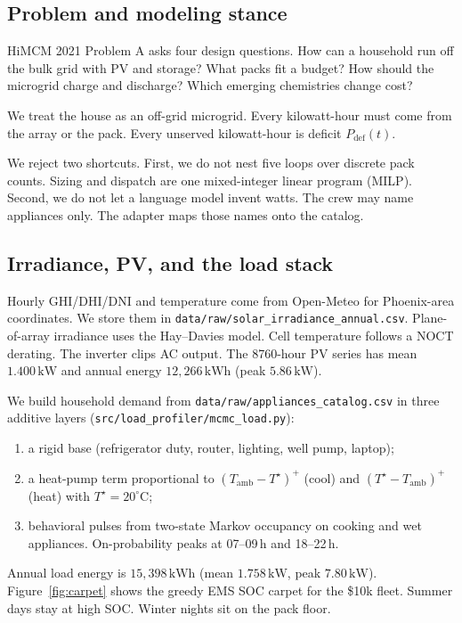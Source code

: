 \documentclass[12pt]{article}
\begin{document}
\subsection{Problem and modeling stance}
HiMCM 2021 Problem A asks four design questions. How can a household
run off the bulk grid with PV and storage? What packs fit a budget?
How should the microgrid charge and discharge? Which emerging
chemistries change cost?

We treat the house as an off-grid microgrid. Every kilowatt-hour must
come from the array or the pack. Every unserved kilowatt-hour is deficit
\(P_{\mathrm{def}}(t)\).

We reject two shortcuts. First, we do not nest five loops over discrete
pack counts. Sizing and dispatch are one mixed-integer linear program
(MILP). Second, we do not let a language model invent watts. The crew
may name appliances only. The adapter maps those names onto the catalog.

\subsection{Irradiance, PV, and the load stack}
Hourly GHI/DHI/DNI and temperature come from Open-Meteo for Phoenix-area
coordinates. We store them in
\texttt{data/raw/solar\_irradiance\_annual.csv}. Plane-of-array irradiance
uses the Hay--Davies model. Cell temperature follows a NOCT derating.
The inverter clips AC output. The 8760-hour PV series has mean
\(1.400\,\mathrm{kW}\) and annual energy \(12{,}266\,\mathrm{kWh}\)
(peak \(5.86\,\mathrm{kW}\)).

We build household demand from
\texttt{data/raw/appliances\_catalog.csv} in three additive layers
(\texttt{src/load\_profiler/mcmc\_load.py}):
\begin{enumerate}[leftmargin=1.4em,itemsep=0.2em]
  \item a rigid base (refrigerator duty, router, lighting, well pump,
        laptop);
  \item a heat-pump term proportional to
        \((T_{\mathrm{amb}}-T^\star)^+\) (cool) and
        \((T^\star-T_{\mathrm{amb}})^+\) (heat) with
        \(T^\star=20^\circ\mathrm{C}\);
  \item behavioral pulses from two-state Markov occupancy on cooking
        and wet appliances. On-probability peaks at 07--09\,h and
        18--22\,h.
\end{enumerate}
Annual load energy is \(15{,}398\,\mathrm{kWh}\) (mean
\(1.758\,\mathrm{kW}\), peak \(7.80\,\mathrm{kW}\)).
Figure~\ref{fig:carpet} shows the greedy EMS SOC carpet for the \$10k
fleet. Summer days stay at high SOC. Winter nights sit on the pack
floor.
\end{document}
